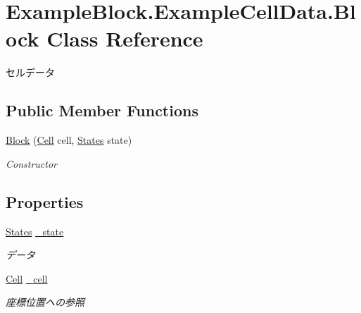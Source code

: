 \hypertarget{class_example_block_1_1_example_cell_data_1_1_block}{}\section{Example\+Block.\+Example\+Cell\+Data.\+Block Class Reference}
\label{class_example_block_1_1_example_cell_data_1_1_block}


セルデータ  


\subsection*{Public Member Functions}
\begin{DoxyCompactItemize}
\item 
\mbox{\hyperlink{class_example_block_1_1_example_cell_data_1_1_block_abee5e078fa801c2d1febce2331eb9bc5}{Block}} (\mbox{\hyperlink{class_hexagonal_map_1_1_domain_1_1_hex_map_1_1_cell}{Cell}} cell, \mbox{\hyperlink{namespace_example_block_1_1_example_cell_data_a6921c403602d917464ccf88b5ac8b2bc}{States}} state)
\begin{DoxyCompactList}\small\item\em Constructor \end{DoxyCompactList}\end{DoxyCompactItemize}
\subsection*{Properties}
\begin{DoxyCompactItemize}
\item 
\mbox{\hyperlink{namespace_example_block_1_1_example_cell_data_a6921c403602d917464ccf88b5ac8b2bc}{States}} \mbox{\hyperlink{class_example_block_1_1_example_cell_data_1_1_block_a6818333cb2347c286e82ecfa3ea1e8b2}{\+\_\+state}}
\begin{DoxyCompactList}\small\item\em データ \end{DoxyCompactList}\item 
\mbox{\hyperlink{class_hexagonal_map_1_1_domain_1_1_hex_map_1_1_cell}{Cell}} \mbox{\hyperlink{class_example_block_1_1_example_cell_data_1_1_block_a85c85a7febcc8766dee105dc58c40bca}{\+\_\+cell}}
\begin{DoxyCompactList}\small\item\em 座標位置への参照 \end{DoxyCompactList}\end{DoxyCompactItemize}


